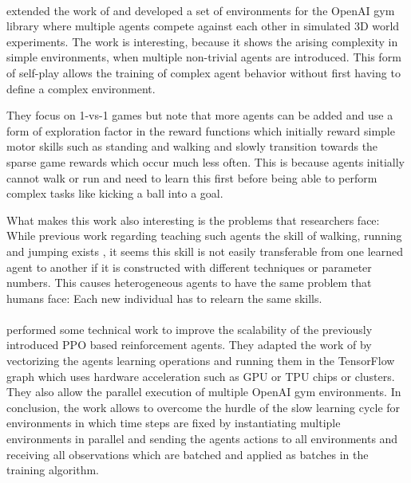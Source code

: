 \documentclass[12pt,a4paper]{article}
\begin{document}
\paragraph{\citeauthor{bansal2017emergent}} extended the work of \cite{proximalpolicyopt} and developed a set of environments for the OpenAI gym library where multiple agents compete against each other in simulated 3D world experiments. The work is interesting, because it shows the arising complexity in simple environments, when multiple non-trivial agents are introduced. This form of self-play allows the training of complex agent behavior without first having to define a complex environment.

They focus on 1-vs-1 games but note that more agents can be added and use a form of exploration factor in the reward functions which initially reward simple motor skills such as standing and walking and slowly transition towards the sparse game rewards which occur much less often. This is because agents initially cannot walk or run and need to learn this first before being able to perform complex tasks like kicking a ball into a goal.

What makes this work also interesting is the problems that researchers face: While previous work regarding teaching such agents the skill of walking, running and jumping exists \cite{heess2017emergence,proximalpolicyopt}, it seems this skill is not easily transferable from one learned agent to another if it is constructed with different techniques or parameter numbers. This causes heterogeneous agents to have the same problem that humans face: Each new individual has to relearn the same skills.

\paragraph{\citeauthor{hafner2017agents}} performed some technical work to improve the scalability of the previously introduced \ac{PPO} based reinforcement agents. They adapted the work of \citeauthor{proximalpolicyopt} by vectorizing the agents learning operations and running them in the TensorFlow graph which uses hardware acceleration such as \ac{GPU} or \ac{TPU} chips or clusters. They also allow the parallel execution of multiple OpenAI gym environments. In conclusion, the work allows to overcome the hurdle of the slow learning cycle for environments in which time steps are fixed by instantiating multiple environments in parallel and sending the agents actions to all environments and receiving all observations which are batched and applied as batches in the training algorithm.


\newpage


\end{document}

